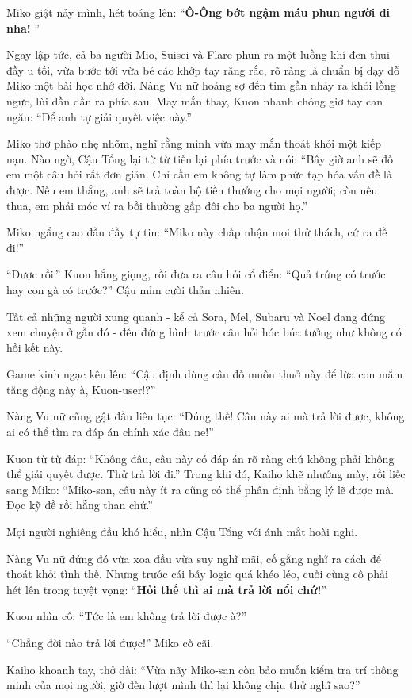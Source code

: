 \documentclass[../main.tex]{subfiles}
\begin{document}
Miko giật nảy mình, hét toáng lên: ``\textbf{Ô-Ông bớt ngậm máu phun người đi nha!} ''

Ngay lập tức, cả ba người Mio, Suisei và Flare phun ra một luồng khí đen thui đầy u tối, vừa bước tới vừa bẻ các khớp tay răng rắc, rõ ràng là chuẩn bị dạy dỗ Miko một bài học nhớ đời. Nàng Vu nữ hoảng sợ đến tim gần nhảy ra khỏi lồng ngực, lùi dần dần ra phía sau. May mắn thay, Kuon nhanh chóng giơ tay can ngăn: ``Để anh tự giải quyết việc này.''

Miko thở phào nhẹ nhõm, nghĩ rằng mình vừa may mắn thoát khỏi một kiếp nạn. Nào ngờ, Cậu Tổng lại từ từ tiến lại phía trước và nói: ``Bây giờ anh sẽ đố em một câu hỏi rất đơn giản. Chỉ cần em không tự làm phức tạp hóa vấn đề là được. Nếu em thắng, anh sẽ trả toàn bộ tiền thưởng cho mọi người; còn nếu thua, em phải móc ví ra bồi thường gấp đôi cho ba người họ.''

Miko ngẩng cao đầu đầy tự tin: ``Miko này chấp nhận mọi thử thách, cứ ra đề đi!''

``Được rồi.'' Kuon hắng giọng, rồi đưa ra câu hỏi cổ điển: ``Quả trứng có trước hay con gà có trước?'' Cậu mỉm cười thản nhiên.

Tất cả những người xung quanh - kể cả Sora, Mel, Subaru và Noel đang đứng xem chuyện ở gần đó - đều đứng hình trước câu hỏi hóc búa tưởng như không có hồi kết này.

Game kinh ngạc kêu lên: ``Cậu định dùng câu đố muôn thuở này để lừa con mắm tăng động này à, Kuon-user!?''

Nàng Vu nữ cũng gật đầu liên tục: ``Đúng thế! Câu này ai mà trả lời được, không ai có thể tìm ra đáp án chính xác đâu ne!''

Kuon từ từ đáp: ``Không đâu, câu này có đáp án rõ ràng chứ không phải không thể giải quyết được. Thử trả lời đi.'' Trong khi đó, Kaiho khẽ nhướng mày, rồi liếc sang Miko: ``Miko-san, câu này ít ra cũng có thể phân định bằng lý lẽ được mà. Đọc kỹ đề rồi hẵng than chứ.''

Mọi người nghiêng đầu khó hiểu, nhìn Cậu Tổng với ánh mắt hoài nghi.

Nàng Vu nữ đứng đó vừa xoa đầu vừa suy nghĩ mãi, cố gắng nghĩ ra cách để thoát khỏi tình thế. Nhưng trước cái bẫy logic quá khéo léo, cuối cùng cô phải hét lên trong tuyệt vọng: ``\textbf{Hỏi thế thì ai mà trả lời nổi chứ!}''

Kuon nhìn cô: ``Tức là em không trả lời được à?''

``Chẳng đời nào trả lời được!'' Miko cố cãi.

Kaiho khoanh tay, thở dài: ``Vừa nãy Miko-san còn bảo muốn kiểm tra trí thông minh của mọi người, giờ đến lượt mình thì lại không chịu thử nghĩ sao?''
\end{document}
